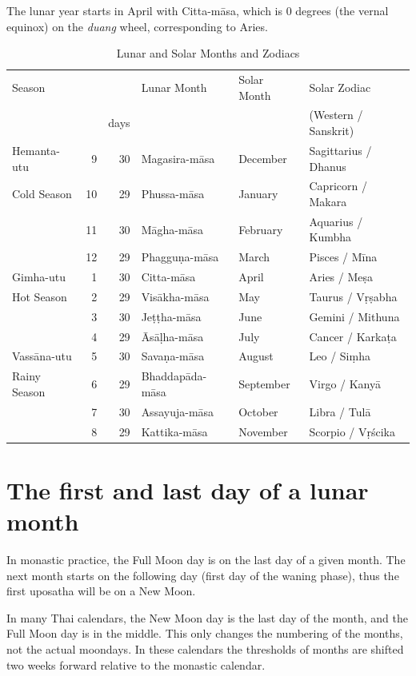 \documentclass[11pt,oneside]{memoir-article}
\begin{document}
The lunar year starts in April with Citta-māsa, which is 0 degrees (the vernal
equinox) on the \emph{duang} wheel, corresponding to Aries.

\begin{table}[h]
\caption{\label{tbl-month-names} Lunar and Solar Months and Zodiacs\cite{hasapannyo-zodiac}}
\centering
\begin{tabular}{lrrlll}
Season &  &  & Lunar Month & Solar Month & Solar Zodiac\\
 &  & days &  &  & (Western / Sanskrit)\\
\hline
Hemanta-utu & 9 & 30 & Magasira-māsa & December & Sagittarius / Dhanus\\
Cold Season & 10 & 29 & Phussa-māsa & January & Capricorn / Makara\\
 & 11 & 30 & Māgha-māsa & February & Aquarius / Kumbha\\
 & 12 & 29 & Phagguṇa-māsa & March & Pisces / Mīna\\
\hline
Gimha-utu & 1 & 30 & Citta-māsa & April & Aries / Meṣa\\
Hot Season & 2 & 29 & Visākha-māsa & May & Taurus / Vṛṣabha\\
 & 3 & 30 & Jeṭṭha-māsa & June & Gemini / Mithuna\\
 & 4 & 29 & Āsāḷha-māsa & July & Cancer / Karkaṭa\\
\hline
Vassāna-utu & 5 & 30 & Savaṇa-māsa & August & Leo / Siṃha\\
Rainy Season & 6 & 29 & Bhaddapāda-māsa & September & Virgo / Kanyā\\
 & 7 & 30 & Assayuja-māsa & October & Libra / Tulā\\
 & 8 & 29 & Kattika-māsa & November & Scorpio / Vṛścika\\
\end{tabular}
\end{table}

\section{The first and last day of a lunar month}
\label{sec-3-2}
\label{lunar-month-first-last}

In monastic practice, the Full Moon day is on the last day of a given
month. The next month starts on the following day (first day of the
waning phase), thus the first uposatha will be on a New Moon.

In many Thai calendars, the New Moon day is the last day of the month,
and the Full Moon day is in the middle. This only changes the
numbering of the months, not the actual moondays. In these calendars
the thresholds of months are shifted two weeks forward relative to the
monastic calendar.
\end{document}
